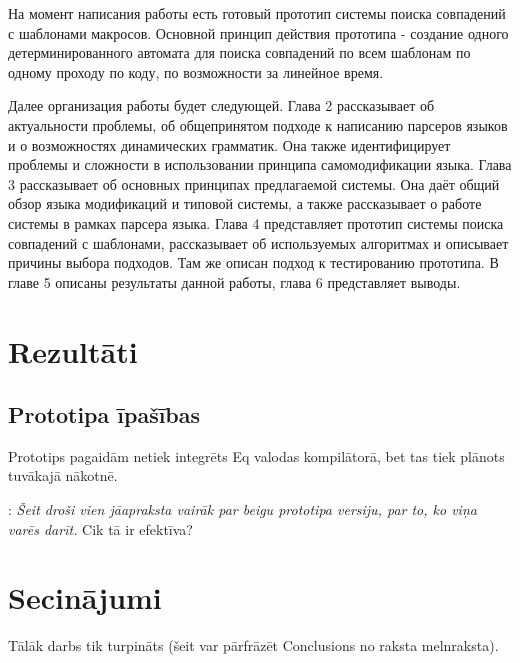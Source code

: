 \documentclass[12pt, a4paper]{report}
\newcommand{\fixme}[1]{\vskip 5mm\noindent{\bf FIXME}: {\it #1}}
\begin{document}
На момент написания работы есть готовый прототип системы поиска совпадений с шаблонами макросов. Основной принцип действия прототипа - создание одного детерминированного автомата для поиска совпадений по всем шаблонам по одному проходу по коду, по возможности за линейное время.

Далее организация работы будет следующей. Глава 2 рассказывает об актуальности проблемы, об общепринятом подходе к написанию парсеров языков и о возможностях динамических грамматик. Она также идентифицирует проблемы и сложности в использовании принципа самомодификации языка. Глава 3 рассказывает об основных принципах предлагаемой системы. Она даёт общий обзор языка модификаций и типовой системы, а также рассказывает о работе системы в рамках парсера языка. Глава 4 представляет прототип системы поиска совпадений с шаблонами, рассказывает об используемых алгоритмах и описывает причины выбора подходов. Там же описан подход к тестированию прототипа. В главе 5 описаны результаты данной работы, глава 6 представляет выводы.



%





\section{Rezultāti}
\subsection{Prototipa īpašības}
 Prototips pagaidām netiek integrēts Eq valodas kompilātorā, bet tas tiek plānots tuvākajā nākotnē.

\fixme{Šeit droši vien jāapraksta vairāk par beigu prototipa versiju, par to, ko viņa varēs darīt.} Cik tā ir efektīva?

\section{Secinājumi}

Tālāk darbs tik turpināts (šeit var pārfrāzēt Conclusions no raksta melnraksta).

\end{document}
